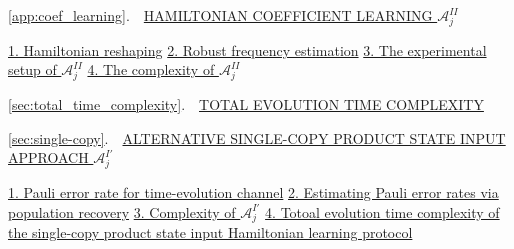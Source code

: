 \documentclass[twocolumn,superscriptaddress,aps,showpacs,amsmath,amstex,amssymb,citeautoscript,floatfix,pra,preprintnumbers]{revtex4-2}
\theoremstyle{plain}
\theoremstyle{plain}
\theoremstyle{plain}
\theoremstyle{plain}
\theoremstyle{plain}
\theoremstyle{plain}
\begin{document}
\begin{appendix}
\noindent 
\ref{app:coef_learning}.~~\hyperref[app:coef_learning]{HAMILTONIAN COEFFICIENT LEARNING $\mathcal{A}^{II}_j$} \dotfill\textbf{\pageref{app:coef_learning}}
\medskip

\noindent \qquad \begin{minipage}{\dimexpr\textwidth-0.82cm}
  \hyperref[sec:app_Hamiltonian_reshaping]{1. Hamiltonian reshaping}\dotfill\textbf{\pageref{sec:app_Hamiltonian_reshaping}}
  \newline
\hyperref[sec:robust_frequency_estimation_details]{2. Robust frequency estimation}\dotfill\textbf{\pageref{sec:robust_frequency_estimation_details}}
\newline
\hyperref[sec:experimental_setup_of_A_2]{3. The experimental setup of $\mathcal{A}_j^{II}$}\dotfill\textbf{\pageref{sec:experimental_setup_of_A_2}}
\newline
\hyperref[sec:complexities_of_A_2]{4. The complexity of $\mathcal{A}_j^{II}$}\dotfill\textbf{\pageref{sec:complexities_of_A_2}}
 \end{minipage}
\medskip

\noindent 
\ref{sec:total_time_complexity}.~~\hyperref[sec:total_time_complexity]{TOTAL EVOLUTION TIME COMPLEXITY} \dotfill\textbf{\pageref{sec:total_time_complexity}}
\medskip


\noindent 
\ref{sec:single-copy}.~~\hyperref[sec:single-copy]{ALTERNATIVE SINGLE-COPY PRODUCT STATE INPUT APPROACH $\mathcal{A}^{I'}_j$} \dotfill\textbf{\pageref{sec:single-copy}}
\medskip

\noindent \qquad \begin{minipage}{\dimexpr\textwidth-0.82cm}
  \hyperref[sec:Pauli_error_rate]{1. Pauli error rate for time-evolution channel}\dotfill\textbf{\pageref{sec:Pauli_error_rate}}
  \newline
\hyperref[sec:population_recovery]{2. Estimating Pauli error rates via population recovery}\dotfill\textbf{\pageref{sec:population_recovery}}
\newline
\hyperref[sec:complexity_single_copy]{3. Complexity of $\mathcal{A}^{I'}_j$}\dotfill\textbf{\pageref{sec:complexity_single_copy}}
\newline
\hyperref[sec:total_evo_time_for_single_copy]{4. Totoal evolution time complexity of the single-copy product state input Hamiltonian learning protocol}\dotfill\textbf{\pageref{sec:total_evo_time_for_single_copy}}

 \end{minipage}
\medskip



\end{appendix}
\end{document}
